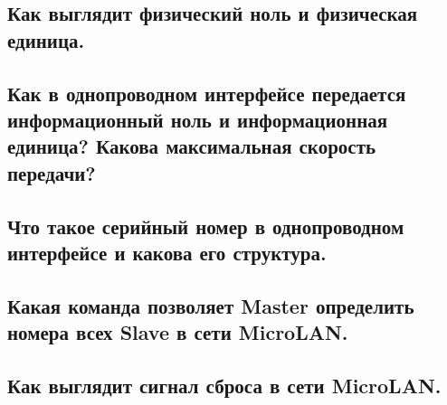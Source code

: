 \subsection{Как выглядит физический ноль и физическая единица.}
\subsection{Как в однопроводном интерфейсе передается информационный ноль и информационная единица? Какова максимальная скорость  передачи?}
\subsection{Что такое серийный номер в однопроводном интерфейсе и какова его структура.}
\subsection{Какая команда позволяет Master определить номера всех Slave в сети MicroLAN.}
\subsection{Как выглядит сигнал сброса в сети MicroLAN.}